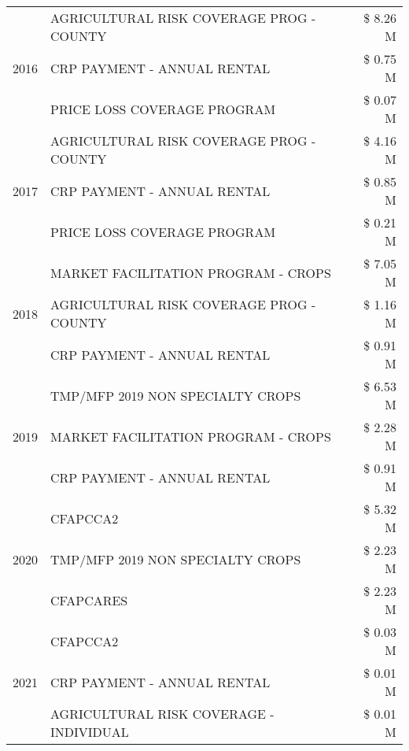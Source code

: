 \begin{tabular}{llr}
\cline{1-3}
\multirow[t]{3}{*}{2016} & AGRICULTURAL RISK COVERAGE PROG - COUNTY & \$ 8.26 M \\
 & CRP PAYMENT - ANNUAL RENTAL & \$ 0.75 M \\
 & PRICE LOSS COVERAGE PROGRAM & \$ 0.07 M \\
\cline{1-3}
\multirow[t]{3}{*}{2017} & AGRICULTURAL RISK COVERAGE PROG - COUNTY & \$ 4.16 M \\
 & CRP PAYMENT - ANNUAL RENTAL & \$ 0.85 M \\
 & PRICE LOSS COVERAGE PROGRAM & \$ 0.21 M \\
\cline{1-3}
\multirow[t]{3}{*}{2018} & MARKET FACILITATION PROGRAM - CROPS & \$ 7.05 M \\
 & AGRICULTURAL RISK COVERAGE PROG - COUNTY & \$ 1.16 M \\
 & CRP PAYMENT - ANNUAL RENTAL & \$ 0.91 M \\
\cline{1-3}
\multirow[t]{3}{*}{2019} & TMP/MFP 2019 NON SPECIALTY CROPS & \$ 6.53 M \\
 & MARKET FACILITATION PROGRAM - CROPS & \$ 2.28 M \\
 & CRP PAYMENT - ANNUAL RENTAL & \$ 0.91 M \\
\cline{1-3}
\multirow[t]{3}{*}{2020} & CFAPCCA2 & \$ 5.32 M \\
 & TMP/MFP 2019 NON SPECIALTY CROPS & \$ 2.23 M \\
 & CFAPCARES & \$ 2.23 M \\
\cline{1-3}
\multirow[t]{3}{*}{2021} & CFAPCCA2 & \$ 0.03 M \\
 & CRP PAYMENT - ANNUAL RENTAL & \$ 0.01 M \\
 & AGRICULTURAL RISK COVERAGE - INDIVIDUAL & \$ 0.01 M \\
\cline{1-3}
\bottomrule
\end{tabular}
